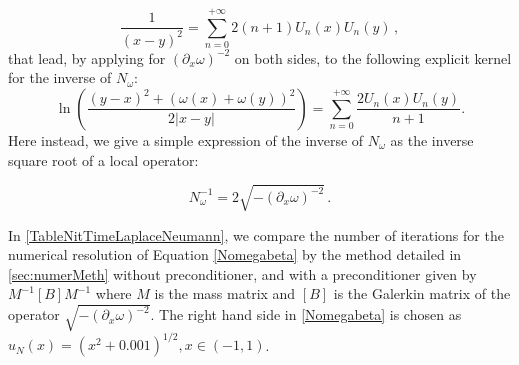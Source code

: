 \documentclass[a4paper]{article}
\begin{document}
\[\frac{1}{(x-y)^2} = \sum_{n=0}^{+\infty} 2(n+1)U_n(x)U_n(y)\,,\]
that lead, by applying for $(\partial_x\omega)^{-2}$ on both sides, to the following explicit kernel for the inverse of $N_\omega$:
\[\ln\left(\dfrac{(y-x)^2 + (\omega(x) + \omega(y))^2}{2|x-y|}\right) = \sum_{n=0}^{+\infty} \dfrac{2 U_n(x) U_n(y)}{n+1}.\]
Here instead, we give a simple expression of the inverse of $N_\omega$ as the inverse square root of a local operator:
\begin{The} 
	\label{the:NeumannInverseLaplace}
	\begin{equation}
	N_\omega^{-1} = 2\sqrt{-(\partial_x \omega)^{-2}}\,.
	\end{equation}
\end{The}
In \autoref{TableNitTimeLaplaceNeumann}, we compare the number of iterations for the numerical resolution of Equation \eqref{Nomegabeta} by the method detailed in \autoref{sec:numerMeth} without preconditioner, and with a preconditioner given by $M^{-1} \left[B \right] M^{-1}$ where $M$ is the mass matrix and $\left[ B \right]$ is the Galerkin matrix of the operator $\sqrt{ -( \partial_x \omega)^{-2}}$. The right hand side in \eqref{Nomegabeta} is chosen as $u_N(x) = (x^2 + 0.001)^{1/2}, x \in (-1,1)$.
\end{document}
